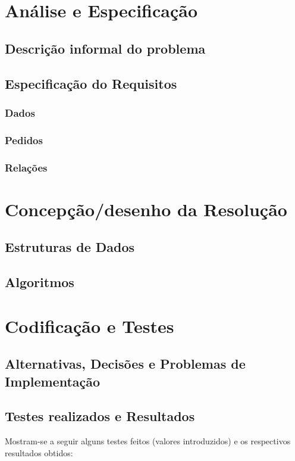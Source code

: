 \documentclass[11pt,a4paper]{report}%
\begin{document}
\chapter{Análise e Especificação} \label{chap:analiseEspecificacao} %
\section{Descrição informal do problema} \label{sec:descricaoProblema} %
\section{Especificação do Requisitos}
\subsection{Dados} \label{subsec:dados} %
\subsection{Pedidos}
\subsection{Relações}

\chapter{Concepção/desenho da Resolução}
\section{Estruturas de Dados}
\section{Algoritmos}

\chapter{Codificação e Testes}
\section{Alternativas, Decisões e Problemas de Implementação}
\section{Testes realizados e Resultados}
Mostram-se a seguir alguns testes feitos (valores introduzidos) e
os respectivos resultados obtidos:
\end{document}
